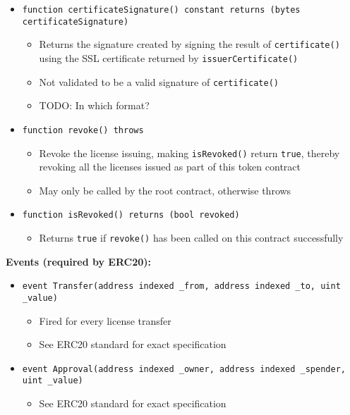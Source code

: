 \documentclass[a4paper]{article}
\newcommand{\todo}[1]{\textsf{TODO: #1}}
\begin{document}
\begin{itemize}
  \item \texttt{function certificateSignature() constant returns (bytes certificateSignature)}
  \begin{itemize}
    \item Returns the signature created by signing the result of \texttt{certificate()} using the SSL certificate returned by \texttt{issuerCertificate()}
    \item Not validated to be a valid signature of \texttt{certificate()}
    \item \todo{In which format?}
  \end{itemize}
  
  \item \texttt{function revoke() throws}
  \begin{itemize}
    \item Revoke the license issuing, making \texttt{isRevoked()} return \texttt{true}, thereby revoking all the licenses issued as part of this token contract
    \item May only be called by the root contract, otherwise throws
  \end{itemize}
  
  \item \texttt{function isRevoked() returns (bool revoked)}
  \begin{itemize}
    \item Returns \texttt{true} if \texttt{revoke()} has been called on this contract successfully
  \end{itemize}
\end{itemize}

\textbf{Events (required by ERC20):}

\begin{itemize}
  \item \texttt{event Transfer(address indexed \_from, address indexed \_to, uint \_value)}
  \begin{itemize}
    \item Fired for every license transfer
    \item See ERC20 standard for exact specification
  \end{itemize}
  
  \item \texttt{event Approval(address indexed \_owner, address indexed \_spender, uint \_value)}
  \begin{itemize}
    \item See ERC20 standard for exact specification
  \end{itemize}
\end{itemize}
\end{document}

